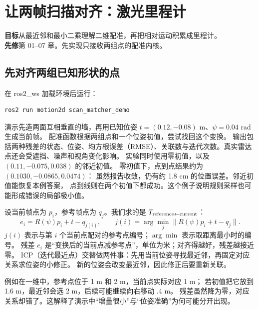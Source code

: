 \chapter{让两帧扫描对齐：激光里程计}\label{ch:icp}
\begin{notebox}
\textbf{目标}\quad 从最近邻和最小二乘理解二维配准，再把相对运动积累成里程计。\\
\textbf{先修}\quad 第 01--07 章。先实现只接收两组点的配准内核。
\end{notebox}

\section{先对齐两组已知形状的点}
在 ros2\_ws 加载环境后运行：
\begin{lstlisting}[language=bash,numbers=none]
ros2 run motion2d scan_matcher_demo
\end{lstlisting}
演示先造两面互相垂直的墙，再用已知位姿
$t=(0.12,-0.08)$ m、$\psi=0.04$ rad 生成当前帧。
配准函数根据两组点和一个位姿初值，尝试找回这个变换。
输出包括两种残差的状态、位姿、均方根误差（RMSE）、关联数与迭代次数。真实雷达点还会受遮挡、噪声和视角变化影响。
实验同时使用零初值，以及 $(0.11,-0.075,0.038)$ 的邻近初值。
零初值下，点到点结果约为 $(0.1030,-0.0865,0.0474)$：
虽然报告收敛，仍有约 1.8 cm 的位置误差。邻近初值能恢复本例答案，
点到线则在两个初值下都成功。这个例子说明规则采样也可能形成错误的局部极小值。

设当前帧点为 $p_i$，参考帧点为 $q_j$。我们求的是
$T_{\rm reference\leftarrow current}$：
\begin{equation}
e_i=R(\psi)p_i+t-q_{j(i)},\qquad
j(i)=\arg\min_j\|R(\psi)p_i+t-q_j\|.
\end{equation}
$j(i)$ 表示与第 $i$ 个当前点配对的参考点编号；$\arg\min$ 表示取距离最小时的编号。
残差 $e_i$ 是“变换后的当前点减参考点”，单位为米；对齐得越好，残差越接近零。
ICP（迭代最近点）交替做两件事：先用当前位姿寻找最近邻，再固定对应关系求位姿的小修正。
新的位姿会改变最近邻，因此修正后要重新关联。

例如在一维中，参考点位于 1 m 和 2 m，当前点实际对应 1 m；
若初值把它放到 1.6 m，最近邻会选 2 m，后续可能继续向右移动 .4 m。
残差虽然降为零，对应关系却错了。这解释了演示中“增量很小”与“位姿准确”为何可能分开出现。

\begin{center}
\end{center}

